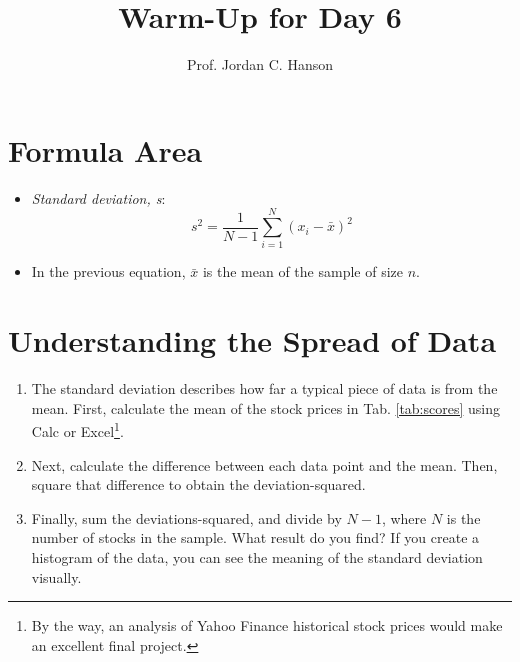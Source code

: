 \documentclass{article}
\begin{document}
\title{Warm-Up for Day 6}
\author{Prof. Jordan C. Hanson}

\maketitle

\section{Formula Area}

\begin{itemize}
\item \textit{Standard deviation, s}:
\begin{equation}
s^2 = \frac{1}{N-1}\sum_{i=1}^{N} (x_i - \bar{x})^2
\end{equation}
\item In the previous equation, $\bar{x}$ is the mean of the sample of size $n$.
\end{itemize}

\section{Understanding the Spread of Data}

\begin{enumerate}
\item The standard deviation describes how far a typical piece of data is from the mean.  First, calculate the mean of the stock prices in Tab. \ref{tab:scores} using Calc or Excel\footnote{By the way, an analysis of Yahoo Finance historical stock prices would make an excellent final project.}. \\ \vspace{1cm}
\item Next, calculate the difference between each data point and the mean.  Then, square that difference to obtain the deviation-squared. \\ \vspace{1cm}
\item Finally, sum the deviations-squared, and divide by $N-1$, where $N$ is the number of stocks in the sample.  What result do you find?  If you create a histogram of the data, you can see the meaning of the standard deviation visually.
\end{enumerate}
\end{document}
